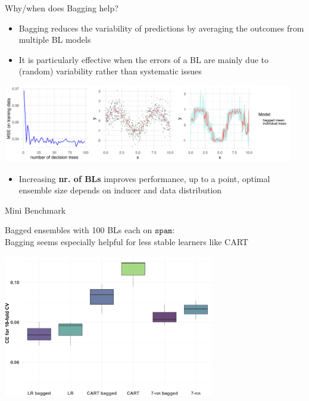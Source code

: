 \documentclass[11pt,compress,t,notes=noshow, xcolor=table]{beamer}
\begin{document}
\begin{vbframe}{Why/when does Bagging help?}

\begin{itemize}
  \item Bagging reduces the variability of predictions by averaging the outcomes from multiple BL models

  \item It is particularly effective when the errors of a BL are mainly due to (random) variability rather than systematic issues
\end{itemize}

\begin{center}
\includegraphics[width=360pt]{figure/bagging-mean.png}
\end{center}

\begin{itemize}
  \item Increasing \textbf{nr. of BLs} improves performance, up to a point, optimal ensemble size depends on inducer and data distribution
\end{itemize}


\end{vbframe}

\begin{vbframe}{Mini Benchmark}

Bagged ensembles with 100 BLs each on $\texttt{spam}$: \\
Bagging seems especially helpful for less stable learners like CART

\begin{center}
\includegraphics[width=260pt]{figure/bagging-bench.png}
\end{center}

\end{vbframe}


\endlecture
\end{document}

